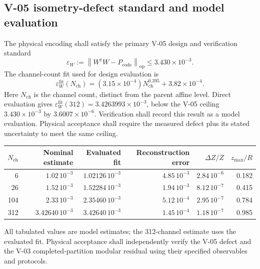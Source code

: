 \documentclass[11pt,a4paper]{article}
\newcommand{\op}{\mathrm{op}}
\newcommand{\code}{\mathrm{code}}
\begin{document}
\subsection{V-05 isometry-defect standard and model evaluation}
The physical encoding shall satisfy the primary V-05 design and verification standard
\begin{equation}
 \varepsilon_W:=\left\|W^\dagger W-P_\code\right\|_\op
 \le3.430\times10^{-3}.
 \label{eq:isometry-standard}
\end{equation}
The channel-count fit used for design evaluation is
\begin{equation}
 \varepsilon_W^{\mathrm{fit}}(N_{\mathrm{ch}})
 =(3.15\times10^{-4})N_{\mathrm{ch}}^{0.395}+3.82\times10^{-4}.
 \label{eq:fit}
\end{equation}
Here $N_{\mathrm{ch}}$ is the channel count, distinct from the parent affine level.
Direct evaluation gives $\varepsilon_W^{\mathrm{fit}}(312)=3.4263993\times10^{-3}$, below the
V-05 ceiling $3.430\times10^{-3}$ by $3.6007\times10^{-6}$. Verification shall
record this result as a model evaluation. Physical acceptance shall require the
measured defect plus its stated uncertainty to meet the same ceiling.
\begin{center}\small
\begin{tabular}{@{}rrrrrr@{}}\toprule
$N_{\mathrm{ch}}$ & Nominal estimate & Evaluated fit & Reconstruction error & $\Delta Z/Z$ & $z_{\max}/R$\\\midrule
6 & $1.02\,10^{-3}$ & $1.02126\,10^{-3}$ & $4.85\,10^{-3}$ & $2.84\,10^{-6}$ & 0.182\\
26 & $1.52\,10^{-3}$ & $1.52284\,10^{-3}$ & $1.94\,10^{-3}$ & $8.12\,10^{-7}$ & 0.415\\
104 & $2.33\,10^{-3}$ & $2.35460\,10^{-3}$ & $5.12\,10^{-4}$ & $2.95\,10^{-7}$ & 0.784\\
312 & $3.42640\,10^{-3}$ & $3.42640\,10^{-3}$ & $1.45\,10^{-4}$ & $1.18\,10^{-7}$ & 0.985\\\bottomrule
\end{tabular}\end{center}
All tabulated values are model estimates; the 312-channel estimate uses the evaluated
fit. Physical acceptance shall independently verify the V-05 defect and the V-03
completed-partition modular residual using their specified observables and protocols.
\end{document}
